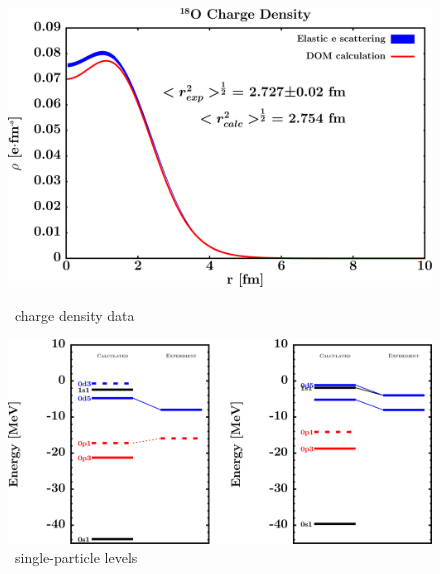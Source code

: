 \afterpage{\clearpage}

\begin{figure}[H]
    \centering
    \begin{minipage}{0.45\textwidth}
        \centering
        \includegraphics[width=1.0\textwidth]{figures/o18_chargeDensity.png}
        \caption{\oEight\ charge density data}
        \label{DOMFitData_o18_chargeDensity}
    \end{minipage}\hfill
    \begin{minipage}{0.45\textwidth}
        \centering
        \includegraphics[width=1.0\textwidth]{figures/o18_SPLevels.png}
        \caption{\oEight\ single-particle levels}
        \label{DOMFitData_o18_SPLevels}
    \end{minipage}
\end{figure}

\afterpage{\clearpage}

